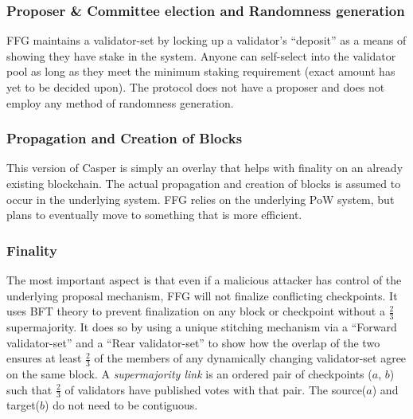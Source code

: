 \documentclass[10pt,journal,compsoc]{IEEEtran}
\begin{document}
\subsubsection{Proposer \& Committee election and Randomness generation}
FFG maintains a validator-set by locking up a validator’s “deposit” as a means of showing they have stake in the system. Anyone can self-select into the validator pool as long as they meet the minimum staking requirement (exact amount has yet to be decided upon). The protocol does not have a proposer and does not employ any method of randomness generation.

\subsubsection{Propagation and Creation of Blocks}
This version of Casper is simply an overlay that helps with finality on an already existing blockchain. The actual propagation and creation of blocks is assumed to occur in the underlying system. FFG relies on the underlying PoW system, but plans to eventually move to something that is more efficient.

\subsubsection{Finality}
The most important aspect is that even if a malicious attacker has control of the underlying proposal mechanism, FFG will not finalize conflicting checkpoints. It uses BFT theory to prevent finalization on any block or checkpoint without a \(\frac{2}{3}\) supermajority. It does so by using a unique stitching mechanism via a “Forward validator-set” and a “Rear validator-set” to show how the overlap of the two ensures at least \(\frac{2}{3}\) of the members of any dynamically changing validator-set agree on the same block. A \emph{supermajority link} is an ordered pair of checkpoints ($a$, $b$) such that \(\frac{2}{3}\) of validators have published votes with that pair. The source($a$) and target($b$) do not need to be contiguous. 
\end{document}
